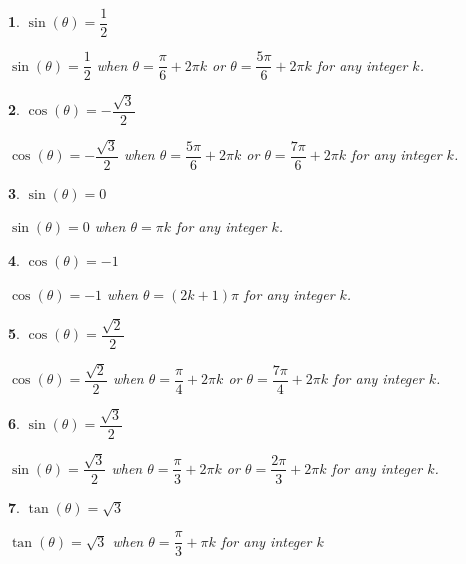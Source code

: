 \documentclass{amsbook}
\newtheorem{exc}{}
\newenvironment{ex}{\begin{exc}\normalfont}{\end{exc}}
\numberwithin{section}{chapter}
\numberwithin{equation}{chapter}
\begin{document}
\begin{multicols}{2}
\begin{ex}
	$\sin(\theta) = \dfrac{1}{2}$
	\begin{sol}
		$\sin(\theta) = \dfrac{1}{2}$ when $\theta = \dfrac{\pi}{6} + 2\pi k$ or $\theta = \dfrac{5\pi}{6} + 2\pi k$ for any integer $k$.
	\end{sol}
\end{ex}

\begin{ex}
	$\cos(\theta) = -\dfrac{\sqrt{3}}{2}$
	\begin{sol}
		$\cos(\theta) = -\dfrac{\sqrt{3}}{2}$ when $\theta = \dfrac{5\pi}{6} + 2\pi k$ or $\theta = \dfrac{7\pi}{6} + 2\pi k$ for any integer $k$.
	\end{sol}
\end{ex}

\begin{ex}
	$\sin(\theta) = 0$
	\begin{sol}
		$\sin(\theta) = 0$ when $\theta = \pi k$ for any integer $k$.
	\end{sol}
\end{ex}

\begin{ex}
	 $\cos(\theta) = -1$
	\begin{sol}
	$\cos(\theta) = -1$ when $\theta = (2k + 1)\pi$ for any integer $k$.	
	\end{sol}
\end{ex}

\begin{ex}
	 $\cos(\theta) = \dfrac{\sqrt{2}}{2}$
	\begin{sol}
		 $\cos(\theta) = \dfrac{\sqrt{2}}{2}$ when $\theta = \dfrac{\pi}{4} + 2\pi k$ or $\theta = \dfrac{7\pi}{4} + 2\pi k$ for any integer $k$.
	\end{sol}
\end{ex}

\begin{ex}
	$\sin(\theta) = \dfrac{\sqrt{3}}{2}$
	\begin{sol}
		$\sin(\theta) = \dfrac{\sqrt{3}}{2}$ when $\theta = \dfrac{\pi}{3} + 2\pi k$ or $\theta = \dfrac{2\pi}{3} + 2\pi k$ for any integer $k$.
	\end{sol}
\end{ex}

\begin{ex}
	$\tan(\theta) = \sqrt{3}$
	\begin{sol}
		$\tan(\theta) = \sqrt{3}$ when $\theta = \dfrac{\pi}{3} + \pi k$ for any integer $k$
	\end{sol}
\end{ex}


\end{multicols}
\end{document}
